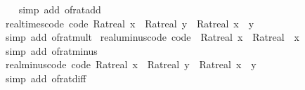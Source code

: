 \begin{isabellebody}
%
\isadelimproof
\ \ %
\endisadelimproof
%
\isatagproof
{}\isamarkupfalse%
\ {\isacharparenleft}{\kern0pt}simp\ add{\isacharcolon}{\kern0pt}\ of{\isacharunderscore}{\kern0pt}rat{\isacharunderscore}{\kern0pt}add{\isacharparenright}{\kern0pt}%
\endisatagproof
{\isafoldproof}%
%
\isadelimproof
\isanewline
%
\endisadelimproof
\isanewline
{}\isamarkupfalse%
\ real{\isacharunderscore}{\kern0pt}times{\isacharunderscore}{\kern0pt}code\ {\isacharbrackleft}{\kern0pt}code{\isacharbrackright}{\kern0pt}{\isacharcolon}{\kern0pt}\ {\isachardoublequoteopen}Ratreal\ x\ {\isacharasterisk}{\kern0pt}\ Ratreal\ y\ {\isacharequal}{\kern0pt}\ Ratreal\ {\isacharparenleft}{\kern0pt}x\ {\isacharasterisk}{\kern0pt}\ y{\isacharparenright}{\kern0pt}{\isachardoublequoteclose}\isanewline
%
\isadelimproof
\ \ %
\endisadelimproof
%
\isatagproof
{}\isamarkupfalse%
\ {\isacharparenleft}{\kern0pt}simp\ add{\isacharcolon}{\kern0pt}\ of{\isacharunderscore}{\kern0pt}rat{\isacharunderscore}{\kern0pt}mult{\isacharparenright}{\kern0pt}%
\endisatagproof
{\isafoldproof}%
%
\isadelimproof
\isanewline
%
\endisadelimproof
\isanewline
{}\isamarkupfalse%
\ real{\isacharunderscore}{\kern0pt}uminus{\isacharunderscore}{\kern0pt}code\ {\isacharbrackleft}{\kern0pt}code{\isacharbrackright}{\kern0pt}{\isacharcolon}{\kern0pt}\ {\isachardoublequoteopen}{\isacharminus}{\kern0pt}\ Ratreal\ x\ {\isacharequal}{\kern0pt}\ Ratreal\ {\isacharparenleft}{\kern0pt}{\isacharminus}{\kern0pt}\ x{\isacharparenright}{\kern0pt}{\isachardoublequoteclose}\isanewline
%
\isadelimproof
\ \ %
\endisadelimproof
%
\isatagproof
{}\isamarkupfalse%
\ {\isacharparenleft}{\kern0pt}simp\ add{\isacharcolon}{\kern0pt}\ of{\isacharunderscore}{\kern0pt}rat{\isacharunderscore}{\kern0pt}minus{\isacharparenright}{\kern0pt}%
\endisatagproof
{\isafoldproof}%
%
\isadelimproof
\isanewline
%
\endisadelimproof
\isanewline
{}\isamarkupfalse%
\ real{\isacharunderscore}{\kern0pt}minus{\isacharunderscore}{\kern0pt}code\ {\isacharbrackleft}{\kern0pt}code{\isacharbrackright}{\kern0pt}{\isacharcolon}{\kern0pt}\ {\isachardoublequoteopen}Ratreal\ x\ {\isacharminus}{\kern0pt}\ Ratreal\ y\ {\isacharequal}{\kern0pt}\ Ratreal\ {\isacharparenleft}{\kern0pt}x\ {\isacharminus}{\kern0pt}\ y{\isacharparenright}{\kern0pt}{\isachardoublequoteclose}\isanewline
%
\isadelimproof
\ \ %
\endisadelimproof
%
\isatagproof
{}\isamarkupfalse%
\ {\isacharparenleft}{\kern0pt}simp\ add{\isacharcolon}{\kern0pt}\ of{\isacharunderscore}{\kern0pt}rat{\isacharunderscore}{\kern0pt}diff{\isacharparenright}{\kern0pt}%

\end{isabellebody}
